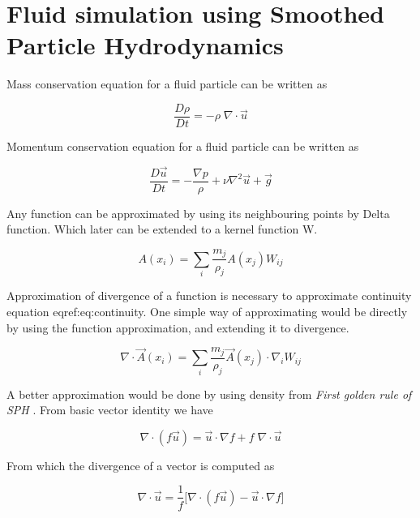 \chapter{Fluid simulation using Smoothed Particle Hydrodynamics}
\label{cha:fluid-simul-using}

Mass conservation equation for a fluid particle can be written as

\begin{equation}
  \label{eq:continuity}
  \frac{D\rho}{Dt} = - \rho \; \nabla \cdot \vec{u}
\end{equation}



Momentum conservation equation for a fluid particle can be written as

\begin{equation}
  \label{eq:momentum}
  \frac{D\vec{u}}{Dt} = - \frac{\nabla p}{\rho} + \nu
  \nabla^2{\vec{u}} + \vec{g}
\end{equation}



Any function can be approximated by using its neighbouring points by Delta
function. Which later can be extended to a kernel function W.



\begin{equation}
  \label{eq:f_app}
  A(x_i) = \sum_i \frac{m_j}{\rho_j} A(x_j) W_{ij}
\end{equation}


Approximation of divergence of a function is necessary to approximate
continuity equation eqref:eq:continuity.  One simple way of approximating would
be directly by using the function approximation, and extending it to divergence.

\begin{equation*}
  \nabla \cdot \vec{A}(x_i) = \sum_i \frac{m_j}{\rho_j}
  \vec{A}(x_j) \cdot \nabla_i W_{ij}
\end{equation*}

A better approximation would be done by using density from \textit{First golden rule
of SPH} \cite{monaghan-1992-smoot-partic-hydrod}.  From basic vector identity we
have

\begin{equation*}
  \nabla\cdot(f \vec{u}) = \vec{u} \cdot
  \nabla{f} + f \; \nabla \cdot \vec{u}
\end{equation*}

From which the divergence of a vector is computed as

\begin{equation*}
  \nabla \cdot \vec{u} = \frac{1}{f} \Big[\nabla\cdot(f
  \vec{u}) - \vec{u} \cdot \nabla{f} \Big]
\end{equation*}

